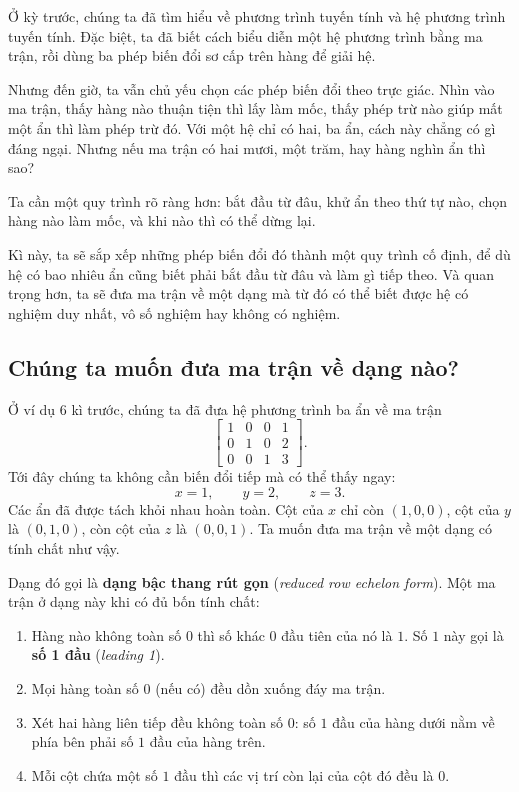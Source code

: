 \documentclass[12pt,a4paper]{article}
\begin{document}
Ở kỳ trước, chúng ta đã tìm hiểu về phương trình tuyến tính và hệ phương trình tuyến tính. Đặc biệt, ta đã biết cách biểu diễn một hệ phương trình bằng ma trận, rồi dùng ba phép biến đổi sơ cấp trên hàng để giải hệ.

Nhưng đến giờ, ta vẫn chủ yếu chọn các phép biến đổi theo trực giác. Nhìn vào ma trận, thấy hàng nào thuận tiện thì lấy làm mốc, thấy phép trừ nào giúp mất một ẩn thì làm phép trừ đó. Với một hệ chỉ có hai, ba ẩn, cách này chẳng có gì đáng ngại. Nhưng nếu ma trận có hai mươi, một trăm, hay hàng nghìn ẩn thì sao?

Ta cần một quy trình rõ ràng hơn: bắt đầu từ đâu, khử ẩn theo thứ tự nào, chọn hàng nào làm mốc, và khi nào thì có thể dừng lại.

Kì này, ta sẽ sắp xếp những phép biến đổi đó thành một quy trình cố định, để dù hệ có bao nhiêu ẩn cũng biết phải bắt đầu từ đâu và làm gì tiếp theo.
Và quan trọng hơn, ta sẽ đưa ma trận về một dạng mà từ đó có thể biết được hệ có nghiệm duy nhất, vô số nghiệm hay không có nghiệm.

\subsection{Chúng ta muốn đưa ma trận về dạng nào?}

Ở ví dụ 6 kì trước, chúng ta đã đưa hệ phương trình ba ẩn về ma trận
$$
\left[ \begin{array}{ccc|c} 1 & 0 & 0 & 1 \\ 0 & 1 & 0 & 2 \\ 0 & 0 & 1 & 3 \end{array} \right].
$$
Tới đây chúng ta không cần biến đổi tiếp mà có thể thấy ngay:
$$
x=1,\qquad y=2,\qquad z=3.
$$
Các ẩn đã được tách khỏi nhau hoàn toàn. Cột của \(x\) chỉ còn \((1,0,0)\), cột của \(y\) là \((0,1,0)\), còn cột của \(z\) là \((0,0,1)\). Ta muốn đưa ma trận về một dạng có tính chất như vậy.

Dạng đó gọi là \textbf{dạng bậc thang rút gọn} (\emph{reduced row echelon form}). Một ma trận ở dạng này khi có đủ bốn tính chất:

\begin{enumerate}
  \item Hàng nào không toàn số \(0\) thì số khác \(0\) đầu tiên của nó là \(1\). Số \(1\) này gọi là \textbf{số 1 đầu} (\emph{leading 1}).
  \item Mọi hàng toàn số \(0\) (nếu có) đều dồn xuống đáy ma trận.
  \item Xét hai hàng liên tiếp đều không toàn số \(0\): số \(1\) đầu của hàng dưới nằm về phía bên phải số \(1\) đầu của hàng trên.
  \item Mỗi cột chứa một số \(1\) đầu thì các vị trí còn lại của cột đó đều là \(0\).
\end{enumerate}
\end{document}
